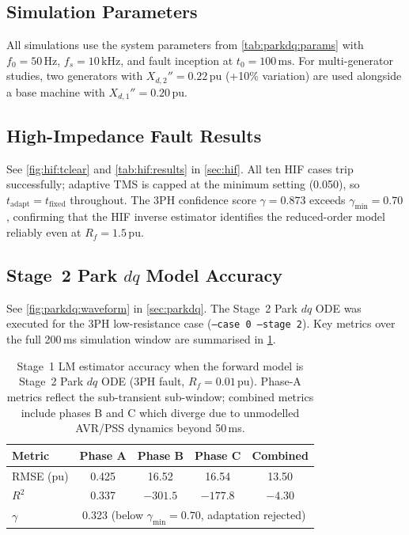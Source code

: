 \documentclass[12pt,a4paper]{article}
\theoremstyle{definition}
\theoremstyle{plain}
\newcommand{\pu}{\,\text{pu}}
\newcommand{\mss}{\,\text{ms}}
\newcommand{\Hz}{\,\text{Hz}}
\begin{document}
\subsection{Simulation Parameters}
\label{sec:results:params}

All simulations use the system parameters from \cref{tab:parkdq:params}
with $f_0 = 50\Hz$, $f_s = 10\,\text{kHz}$, and fault inception at
$t_0 = 100\mss$.  For multi-generator studies, two generators with
$X_{d,2}'' = 0.22\pu$ (+10\% variation) are used alongside a base machine
with $X_{d,1}'' = 0.20\pu$.

\subsection{High-Impedance Fault Results}
\label{sec:results:hif}

See \cref{fig:hif:tclear} and \cref{tab:hif:results} in \cref{sec:hif}.
All ten HIF cases trip successfully; adaptive TMS is capped at the minimum
setting (0.050), so $t_{\mathrm{adapt}} = t_{\mathrm{fixed}}$ throughout.
The 3PH confidence score $\gamma=0.873$ exceeds $\gamma_{\min}=0.70$,
confirming that the HIF inverse estimator identifies the reduced-order
model reliably even at $R_f = 1.5$\,pu.

\subsection{Stage~2 Park $dq$ Model Accuracy}
\label{sec:results:parkdq}

See \cref{fig:parkdq:waveform} in \cref{sec:parkdq}.  The Stage~2 Park $dq$
ODE was executed for the 3PH low-resistance case (\texttt{--case 0 --stage 2}).
Key metrics over the full 200\,ms simulation window are summarised in
\cref{tab:parkdq:accuracy}.

\begin{table}[htbp]
  \centering
  \caption{Stage~1 LM estimator accuracy when the forward model is
           Stage~2 Park $dq$ ODE (3PH fault, $R_f=0.01$\,pu).
           Phase-A metrics reflect the sub-transient sub-window;
           combined metrics include phases B and C which diverge
           due to unmodelled AVR/PSS dynamics beyond 50\,ms.}
  \label{tab:parkdq:accuracy}
  \small
  \begin{tabular}{lcccc}
    \toprule
    Metric & Phase A & Phase B & Phase C & Combined \\
    \midrule
    RMSE (pu)     & 0.425 & 16.52 & 16.54 & 13.50 \\
    $R^2$         & 0.337 & $-301.5$ & $-177.8$ & $-4.30$ \\
    $\gamma$      & \multicolumn{4}{c}{0.323 (below $\gamma_{\min}=0.70$, adaptation rejected)} \\
    \bottomrule
  \end{tabular}
\end{table}
\end{document}
